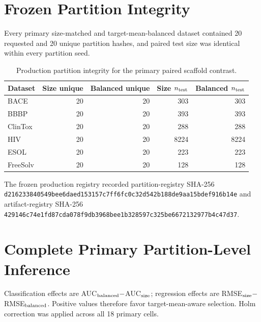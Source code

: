 \section{Frozen Partition Integrity}
\label{sec:si-partitions}

Every primary size-matched and target-mean-balanced dataset contained 20 requested and 20 unique partition hashes, and paired test size was identical within every partition seed.

\begin{table}[!htbp]
\centering
\caption{Production partition integrity for the primary paired scaffold contrast.}
\label{tab:si-partition-integrity}
\begin{tabular}{lrrrr}
\toprule
Dataset & Size unique & Balanced unique & Size $n_{\rm test}$ & Balanced $n_{\rm test}$ \\
\midrule
BACE & 20 & 20 & 303 & 303 \\
BBBP & 20 & 20 & 393 & 393 \\
ClinTox & 20 & 20 & 288 & 288 \\
HIV & 20 & 20 & 8224 & 8224 \\
ESOL & 20 & 20 & 223 & 223 \\
FreeSolv & 20 & 20 & 128 & 128 \\
\bottomrule
\end{tabular}
\end{table}

The frozen production registry recorded partition-registry SHA-256 \texttt{d216233840549bee6daed153157c7ff6fc0c32d542b188de9aa15bdef916b14e} and artifact-registry SHA-256 \texttt{429146c74e1fd87cda078f9db3968bee1b328597c325be6672132977b4c47d37}.

\section{Complete Primary Partition-Level Inference}
\label{sec:si-primary}

Classification effects are AUC$_{\rm balanced}-$AUC$_{\rm size}$; regression effects are RMSE$_{\rm size}-$RMSE$_{\rm balanced}$. Positive values therefore favor target-mean-aware selection. Holm correction was applied across all 18 primary cells.

